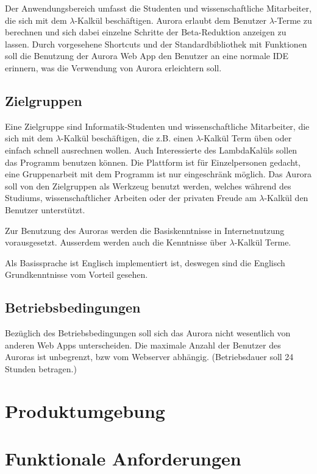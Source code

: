 \documentclass[parskip=full,11pt,twoside]{scrartcl}
\begin{document}
Der Anwendungsbereich umfasst die Studenten und wissenschaftliche Mitarbeiter, die sich mit dem $\lambda$-Kalkül beschäftigen. Aurora erlaubt dem Benutzer $\lambda$-Terme zu berechnen und sich dabei einzelne Schritte der Beta-Reduktion anzeigen zu lassen. Durch vorgesehene Shortcuts und der Standardbibliothek mit Funktionen soll die Benutzung  der Aurora Web App den Benutzer an eine normale IDE erinnern, was die Verwendung von Aurora erleichtern soll.

\subsection{Zielgruppen}

Eine Zielgruppe sind Informatik-Studenten und wissenschaftliche Mitarbeiter, die sich mit dem $\lambda$-Kalkül beschäftigen, die z.B. einen $\lambda$-Kalkül Term  üben oder einfach schnell ausrechnen wollen. Auch Interessierte des LambdaKalüls sollen das Programm benutzen können. Die Plattform ist für Einzelpersonen gedacht, eine Gruppenarbeit mit dem Programm ist nur eingeschränk möglich. Das Aurora soll von den Zielgruppen als Werkzeug benutzt werden, welches während des Studiums, wissenschaftlicher Arbeiten oder der privaten Freude am $\lambda$-Kalkül den Benutzer unterstützt.

Zur Benutzung des Auroras werden die Basiskenntnisse in Internetnutzung vorausgesetzt. Ausserdem werden auch die Kenntnisse über $\lambda$-Kalkül Terme.

Als Basissprache ist Englisch implementiert ist, deswegen sind die Englisch Grundkenntnisse vom Vorteil gesehen.

\subsection{Betriebsbedingungen}
Bezüglich des Betriebsbedingungen soll sich das Aurora nicht wesentlich von anderen Web Apps unterscheiden. Die maximale Anzahl der Benutzer des Auroras ist unbegrenzt, bzw vom Webserver abhängig. (Betriebsdauer soll 24 Stunden betragen.) 


\section{Produktumgebung}



\section{Funktionale Anforderungen}
\end{document}
